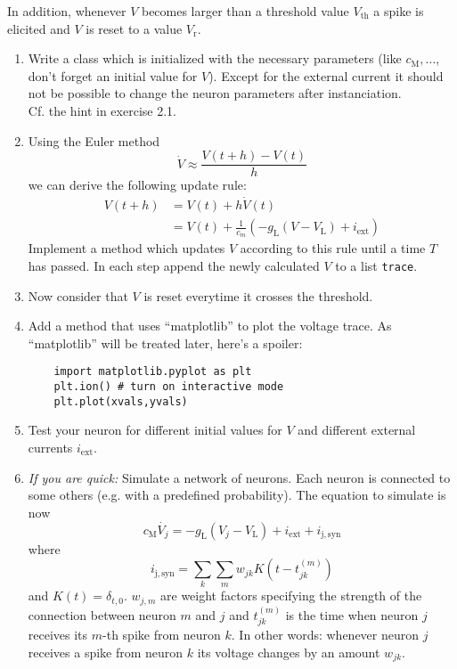 \documentclass[12pt]{scrartcl}
\newcommand{\ind}[1]{_{\mathrm{#1}}}
\begin{document}
In addition, whenever $V$ becomes larger than a threshold value $V\ind{th}$ a spike is elicited and $V$ is reset to a value $V\ind{r}$.
\begin{enumerate}
\item Write a class which is initialized with the necessary parameters (like $c\ind{M},\dots$, don't forget an initial value for $V$). Except for the external current it should not be possible to change the neuron parameters after instanciation.\\
Cf. the hint in exercise 2.1.
\item Using the Euler method 
\[ \dot{V}\approx\frac{V(t+h)-V(t)}{h}\]
we can derive the following update rule:
\begin{align}
  V(t+h) &= V(t) + h\dot{V}(t) \\
  &= V(t) + \frac{1}{c_m}\left( -g\ind{L}\left(V-V\ind{L}\right)+i\ind{ext} \right)
\end{align}
Implement a method which updates $V$ according to this rule until a time $T$ has passed. In each step append the newly calculated $V$ to a list \texttt{trace}.
\item Now consider that $V$ is reset everytime it crosses the threshold.
\item Add a method that uses ``matplotlib'' to plot the voltage
  trace. As ``matplotlib'' will be treated later, here's a spoiler:
  \begin{lstlisting}
    import matplotlib.pyplot as plt
    plt.ion() # turn on interactive mode
    plt.plot(xvals,yvals)
  \end{lstlisting}
\item Test your neuron for different initial values for $V$ and different
  external currents $i\ind{ext}$.
\item \emph{If you are quick:} Simulate a network of neurons. Each neuron is
  connected to some others (e.g. with a predefined probability). The equation
  to simulate is now 
\[c\ind{M}\dot{V_j}=-g\ind{L}\left(V_j-V\ind{L}\right)+i\ind{ext} + i\ind{j,syn}\]
where 
\[i\ind{j,syn} = \sum\limits_k \sum\limits_{m} w_{jk} K(t-t_{jk}^{(m)})\]
and $K(t)=\delta_{t,0}$. $w_{j,m}$ are weight factors specifying the strength
of the connection between neuron $m$ and $j$ and $t_{jk}^{(m)}$ is the time
when neuron $j$ receives its $m$-th spike from neuron $k$. In other words:
whenever neuron $j$ receives a spike from neuron $k$ its voltage changes by an
amount $w_{jk}$.
  
\end{enumerate}
\end{document}
